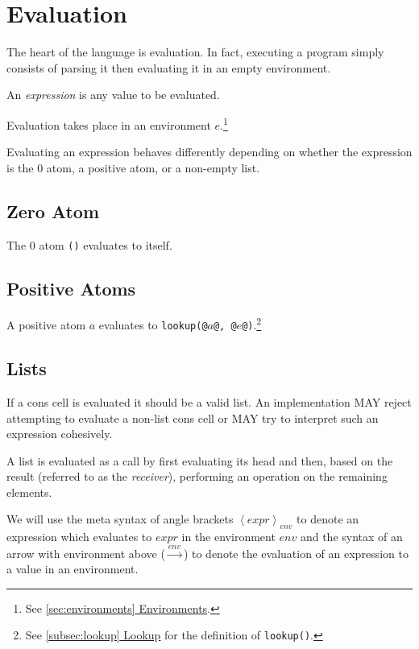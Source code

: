 \documentclass[twocolumn]{report}
\newcommand{\intralink}[2]{\hyperref[#1]{\ref*{#1} #2}}
\begin{document}
\section{Evaluation}
\label{sec:evaluation}

The heart of the language is evaluation.
In fact, executing a program simply consists of parsing it then evaluating it in an empty environment.

An \emph{expression} is any value to be evaluated.

Evaluation takes place in an environment $e$.\footnote{See \intralink{sec:environments}{Environments}.}

Evaluating an expression behaves differently depending on whether the expression is the $0$ atom, a positive atom, or a non-empty list.

\subsection{Zero Atom}
\label{sec:eval_zero_atom}

The $0$ atom \texttt{()} evaluates to itself.

\subsection{Positive Atoms}
\label{sec:eval_positive_atom}

A positive atom $a$ evaluates to \texttt{lookup(@$a$@, @$e$@)}.\footnote{See \intralink{subsec:lookup}{Lookup} for the definition of \texttt{lookup()}.}

\subsection{Lists}
\label{sec:eval_list}

If a cons cell is evaluated it should be a valid list.
An implementation MAY reject attempting to evaluate a non-list cons cell or MAY try to interpret such an expression cohesively.

A list is evaluated as a call by first evaluating its head and then, based on the result (referred to as the \emph{receiver}), performing an operation on the remaining elements.

We will use the meta syntax of angle brackets $\left\langle expr \right\rangle_{env}$ to denote an expression which evaluates to $expr$ in the environment $env$ and the syntax of an arrow with environment above ($\xrightarrow{env}$) to denote the evaluation of an expression to a value in an environment.
\end{document}
